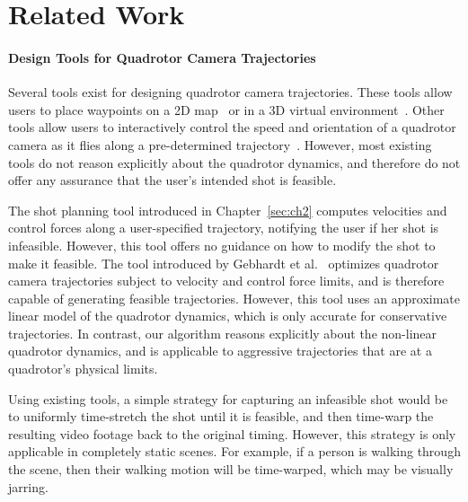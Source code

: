 \section{Related Work}

\paragraph{Design Tools for Quadrotor Camera Trajectories}

Several tools exist for designing quadrotor camera trajectories.
These tools allow users to place waypoints on a 2D map~\cite{apm:2015,dji:2015} or in a 3D virtual environment~\cite{meier:2012,joubert:2015,gebhardt:2016}.
Other tools allow users to interactively control the speed and orientation of a quadrotor camera as it flies along a pre-determined trajectory~\cite{3drobotics:2015,dji:2015a,joubert:2015}. 
However, most existing tools do not reason explicitly about the quadrotor dynamics, and therefore do not offer any assurance that the user's intended shot is feasible.


The shot planning tool introduced in Chapter~\ref{sec:ch2} computes velocities and control forces along a user-specified trajectory, notifying the user if her shot is infeasible. However, this tool offers no guidance on how to modify the shot to make it feasible.
The tool introduced by Gebhardt et al.~ optimizes quadrotor camera trajectories subject to velocity and control force limits, and is therefore capable of generating feasible trajectories.
However, this tool uses an approximate linear model of the quadrotor dynamics, which is only accurate for conservative trajectories.
In contrast, our algorithm reasons explicitly about the non-linear quadrotor dynamics, and is applicable to aggressive trajectories that are at a quadrotor's physical limits.

Using existing tools, a simple strategy for capturing an infeasible shot would be to uniformly time-stretch the shot until it is feasible, and then time-warp the resulting video footage back to the original timing.
However, this strategy is only applicable in completely static scenes.
For example, if a person is walking through the scene, then their walking motion will be time-warped, which may be visually jarring.


